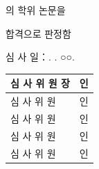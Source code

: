 \thispagestyle{empty}
\begin{center}
  \vspace*{5mm}

  {\fontsize{20}{26}\selectfont \authorname 의 \degreetype 학위 논문을}

  \vspace{5mm}

  {\fontsize{20}{26}\selectfont 합격으로 판정함}

  \vspace{18mm}

  {\fontsize{14}{18}\selectfont 심 사 일：\submityear. \submitmonth. ○○.}

  \vspace{28mm}

  \begin{tabular}{p{}p{}}
    {\fontsize{14}{18}\selectfont 심 사 위 원 장} & {\fontsize{14}{18}\selectfont 인} \\ \hline\noalign{\vspace{4mm}}
    {\fontsize{14}{18}\selectfont 심 사 \; 위 \; 원} & {\fontsize{14}{18}\selectfont 인} \\ \hline\noalign{\vspace{4mm}}
    {\fontsize{14}{18}\selectfont 심 사 \; 위 \; 원} & {\fontsize{14}{18}\selectfont 인} \\ \hline\noalign{\vspace{4mm}}
    {\fontsize{14}{18}\selectfont 심 사 \; 위 \; 원} & {\fontsize{14}{18}\selectfont 인} \\ \hline\noalign{\vspace{4mm}}
    {\fontsize{14}{18}\selectfont 심 사 \; 위 \; 원} & {\fontsize{14}{18}\selectfont 인} \\ \hline
\end{tabular}

  \vspace{40mm}

  {\fontsize{20}{26}\selectfont \gradschool}
\end{center}
\newpage
